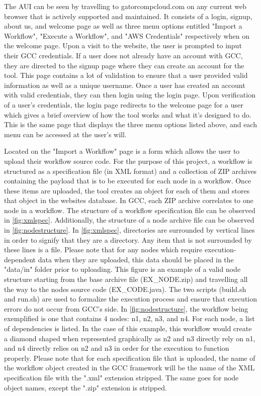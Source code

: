 \documentclass[fleqn,10pt]{SelfArx} %
\begin{document}
The AUI can be seen by travelling to gatorcompcloud.com on any current web browser that is actively supported and maintained. It consists of a login, signup, about us, and welcome page as well as three menu options entitled "Import a Workflow", "Execute a Workflow", and "AWS Credentials" respectively when on the welcome page. Upon a visit to the website, the user is prompted to input their GCC credentials. If a user does not already have an account with GCC, they are directed to the signup page where they can create an account for the tool. This page contains a lot of validation to ensure that a user provided valid information as well as a unique username. Once a user has created an account with valid credentials, they can then login using the login page. Upon verification of a user's credentials, the login page redirects to the welcome page for a user which gives a brief overview of how the tool works and what it's designed to do. This is the same page that displays the three menu options listed above, and each menu can be accessed at the user's will.

Located on the "Import a Workflow" page is a form which allows the user to upload their workflow source code. For the purpose of this project, a workflow is structured as a specification file (in XML format) and a collection of ZIP archives containing the payload that is to be executed for each node in a workflow. Once these items are uploaded, the tool creates an object for each of them and stores that object in the websites database. In GCC, each ZIP archive correlates to one node in a workflow. The structure of a workflow specification file can be observed in \ref{fig:xmlspec}. Additionally, the structure of a node archive file can be observed in \ref{fig:nodestructure}. In \ref{fig:xmlspec}, directories are surrounded by vertical lines in order to signify that they are a directory. Any item that is not surrounded by these lines is a file. Please note that for any nodes which require execution-dependent data when they are uploaded, this data should be placed in the "data/in" folder prior to uploading. This figure is an example of a valid node structure starting from the base archive file (EX\_NODE.zip) and travelling all the way to the nodes source code (EX\_CODE.java). The two scripts (build.sh and run.sh) are used to formalize the execution process and ensure that execution errors do not occur from GCC's side. In \ref{fig:nodestructure}, the workflow being exemplified is one that contains 4 nodes: n1, n2, n3, and n4. For each node, a list of dependencies is listed. In the case of this example, this workflow would create a diamond shaped when represented graphically as n2 and n3 directly rely on n1, and n4 directly relies on n2 and n3 in order for the execution to function properly. Please note that for each specification file that is uploaded, the name of the workflow object created in the GCC framework will be the name of the XML specification file with the ".xml" extension stripped. The same goes for node object names, except the ".zip" extension is stripped.
\end{document}

